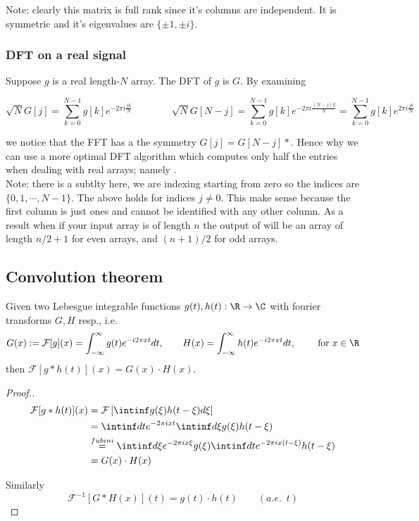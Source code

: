 \documentclass[12pt]{article}
\begin{document}
Note: clearly this matrix is full rank since it's columns are independent. It is symmetric and it's eigenvalues are $\{\pm 1 , \pm i\}$.

\subsubsection{DFT on a real signal}
Suppose $g$ is a real length-$N$ array. The DFT of $g$ is $G$. By examining 

$$\sqrt N G[j] = \sum_{k=0}^{N-1} g[k]e^{-2\pi i \frac{jk}{N}} \qquad\qquad \sqrt N G[N-j] = \sum_{k=0}^{N-1}g[k]e^{-2\pi i \frac{(N-j)k}{N}} = \sum_{k=0}^{N-1}g[k]e^{2\pi i \frac{jk}{N}}$$

we notice that the FFT has a the symmetry $G[j] = G[N-j]*$. Hence why we can use a more optimal DFT algorithm which computes only half the entries when dealing with real arrays; namely .\\

Note: there is a subtlty here, we are indexing starting from zero so the indices are $\{0,1,\cdots,N-1\}$. The above holds for indices $j \neq 0$. This make sense because the first column is just ones and cannot be identified with any other column. As a result when if your input array is of length $n$ the output of  will be an array of length $n/2+1$ for even arrays, and $(n+1)/2$ for odd arrays. 

\subsection{Convolution theorem}
Given two Lebesgue integrable functions $g(t),h(t) : \R \to\C$ with fourier transforms $G,H$ resp., i.e.
$$G(x):= \mathcal F[g](x) = \int_{-\infty}^\infty g(t)e^{-i2\pi x t} dt,\qquad H(x) = \int_{-\infty}^\infty h(t)e^{-i2\pi x t}dt,\qquad \text{ for }x\in\R$$
then $\mathcal F[g\ast h(t)](x) = G(x)\cdot H(x)$. 
\begin{proof}[Proof.]
\begin{equation}\label{eq:convolution thm proof}
\begin{aligned}
\mathcal F[g\ast h(t)](x)   &= \mathcal F\left[ \intinf g(\xi)h(t-\xi)d\xi \right]\\
                            &= \intinf dt e^{-2\pi i x t} \intinf d\xi g(\xi)h(t-\xi)\\
                            &\stackrel{fubini}{=} \intinf d\xi e^{-2\pi i x \xi} g(\xi) \intinf dt e^{-2\pi i x (t-\xi)} h(t-\xi)\\
                            &= G(x)\cdot H(x)
\end{aligned}
\end{equation}

Similarly 
$$\mathcal F^{-1}\left[ G\ast H(x) \right](t) = g(t)\cdot h(t)\qquad (a.e. \,\,\,t)$$
\end{proof}
\end{document}
